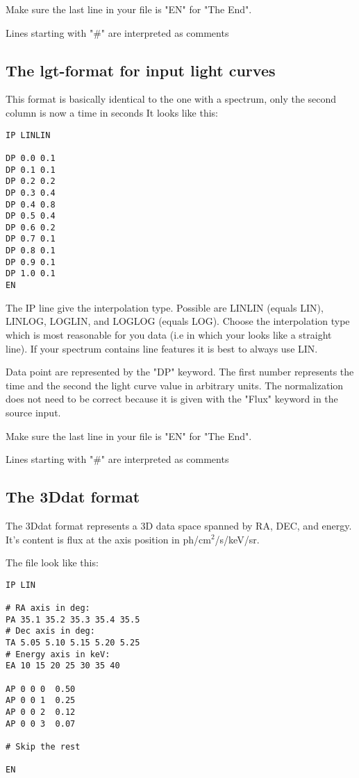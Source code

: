 Make sure the last line in your file is "EN" for "The End".

Lines starting with "\#" are interpreted as comments

\subsection{The lgt-format for input light curves \label{label:lightcurvefile}}

This format is basically identical to the one with a spectrum, only the second column is now a time in seconds
It looks like this:
\begin{verbatim}
IP LINLIN

DP 0.0 0.1
DP 0.1 0.1
DP 0.2 0.2
DP 0.3 0.4
DP 0.4 0.8
DP 0.5 0.4
DP 0.6 0.2
DP 0.7 0.1
DP 0.8 0.1
DP 0.9 0.1
DP 1.0 0.1
EN
\end{verbatim}

The IP line give the interpolation type. Possible are LINLIN (equals LIN), LINLOG, LOGLIN, and LOGLOG (equals LOG). Choose the interpolation type which is most reasonable for you data (i.e in which your looks like a straight line).
If your spectrum contains line features it is best to always use LIN.

Data point are represented by the "DP" keyword.
The first number represents the time and the second the light curve value in arbitrary units.
The normalization does not need to be correct because it is given with the "Flux" keyword in the source input.

Make sure the last line in your file is "EN" for "The End".

Lines starting with "\#" are interpreted as comments

\subsection{The 3Ddat format \label{input:3Ddat}}

The 3Ddat format represents a 3D data space spanned by RA, DEC, and energy. It's content is flux at the axis position in ph/cm$^2$/s/keV/sr.

The file look like this:

\begin{verbatim}
IP LIN

# RA axis in deg:
PA 35.1 35.2 35.3 35.4 35.5
# Dec axis in deg:
TA 5.05 5.10 5.15 5.20 5.25
# Energy axis in keV:
EA 10 15 20 25 30 35 40

AP 0 0 0  0.50
AP 0 0 1  0.25
AP 0 0 2  0.12
AP 0 0 3  0.07

# Skip the rest

EN
\end{verbatim}

